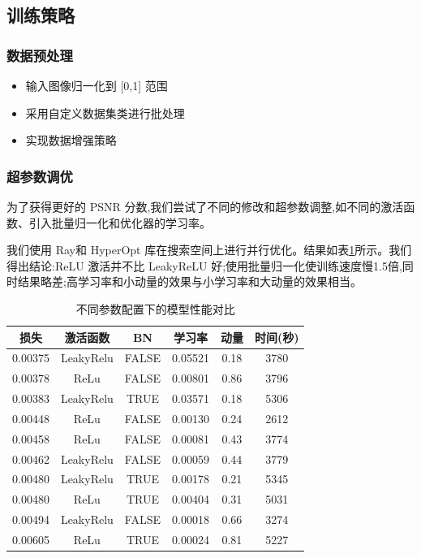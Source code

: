 \documentclass[UTF8]{ctexart}
\begin{document}
\subsection{训练策略}
\subsubsection{数据预处理}
\begin{itemize}
    \item 输入图像归一化到 [0,1] 范围
    \item 采用自定义数据集类进行批处理
    \item 实现数据增强策略
\end{itemize}

\subsubsection{超参数调优}
为了获得更好的 PSNR 分数,我们尝试了不同的修改和超参数调整,如不同的激活函数、引入批量归一化和优化器的学习率。

我们使用 Ray和 HyperOpt 库在搜索空间上进行并行优化。结果如表\ref{tab:hyperparameters}所示。我们得出结论:ReLU 激活并不比 LeakyReLU 好;使用批量归一化使训练速度慢1.5倍,同时结果略差;高学习率和小动量的效果与小学习率和大动量的效果相当。


\begin{table}[htbp]
    \centering
    \caption{不同参数配置下的模型性能对比}
    \begin{tabular}{|c|c|c|c|c|c|}
    \hline
    损失 & 激活函数 & BN & 学习率 & 动量 & 时间(秒) \\
    \hline
    0.00375 & LeakyRelu & FALSE & 0.05521 & 0.18 & 3780 \\
    0.00378 & ReLu & FALSE & 0.00801 & 0.86 & 3796 \\
    0.00383 & LeakyRelu & TRUE & 0.03571 & 0.18 & 5306 \\
    0.00448 & ReLu & FALSE & 0.00130 & 0.24 & 2612 \\
    0.00458 & ReLu & FALSE & 0.00081 & 0.43 & 3774 \\
    0.00462 & LeakyRelu & FALSE & 0.00059 & 0.44 & 3779 \\
    0.00480 & LeakyRelu & TRUE & 0.00178 & 0.21 & 5345 \\
    0.00480 & ReLu & TRUE & 0.00404 & 0.31 & 5031 \\
    0.00494 & LeakyRelu & FALSE & 0.00018 & 0.66 & 3274 \\
    0.00605 & ReLu & TRUE & 0.00024 & 0.81 & 5227 \\
    \hline
    \end{tabular}
    \label{tab:hyperparameters}
    \end{table}
\end{document}
